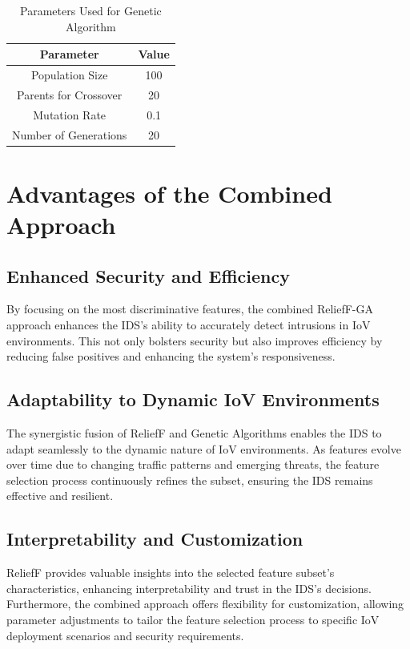 \begin{table}[h]
\centering
\caption{Parameters Used for Genetic Algorithm}
\label{tab:genetic_algorithm_parameters}
\begin{tabular}{|c|c|}
\hline
\textbf{Parameter} & \textbf{Value} \\ \hline
Population Size & 100 \\ \hline
Parents for Crossover & 20 \\ \hline
Mutation Rate & 0.1 \\ \hline
Number of Generations & 20 \\ \hline
\end{tabular}
\end{table}

\section{Advantages of the Combined Approach}

\subsection{Enhanced Security and Efficiency}

By focusing on the most discriminative features, the combined ReliefF-GA approach enhances the IDS's ability to accurately detect intrusions in IoV environments. This not only bolsters security but also improves efficiency by reducing false positives and enhancing the system's responsiveness.

\subsection{Adaptability to Dynamic IoV Environments}

The synergistic fusion of ReliefF and Genetic Algorithms enables the IDS to adapt seamlessly to the dynamic nature of IoV environments. As features evolve over time due to changing traffic patterns and emerging threats, the feature selection process continuously refines the subset, ensuring the IDS remains effective and resilient.

\subsection{Interpretability and Customization}

ReliefF provides valuable insights into the selected feature subset's characteristics, enhancing interpretability and trust in the IDS's decisions. Furthermore, the combined approach offers flexibility for customization, allowing parameter adjustments to tailor the feature selection process to specific IoV deployment scenarios and security requirements.


